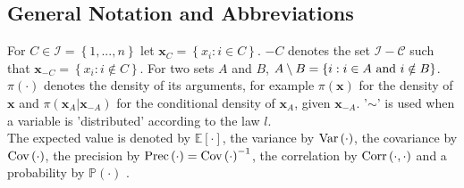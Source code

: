 \subsection{General Notation and Abbreviations}
For $C\in\mathcal{I}=\left\lbrace1,...,n\right\rbrace$ let $\pmb{x}_C=\left\lbrace x_i:i\in C\right\rbrace$. $-C$ denotes the set $\mathcal{I-C}$ such that $\pmb{x}_{-C}=\left\lbrace x_i:i\notin C\right\rbrace$. For two sets $A$ and $B$, $A\setminus B=\left\lbrace i:i\in A \hbox{ and } i \notin B\right\rbrace$. \\
$\pi\left(\cdot\right)$ denotes the density of its arguments, for example $\pi\left(\pmb{x}\right)$ for the density of $\pmb{x}$ and $\pi\left(\pmb{x}_A|\pmb{x}_{-A}\right)$ for the conditional density of $\pmb{x}_A$, given $\pmb{x}_{-A}$. '$\sim$' is used when a variable is 'distributed' according to the law $l$.  \\
The expected value is denoted by $\mathbb{E}\left[\cdot\right]$, the variance by $\hbox{Var}\left(\cdot\right)$, the covariance by $\hbox{Cov}\left(\cdot\right)$, the precision by $\hbox{Prec}\left(\cdot\right)=\hbox{Cov}\left(\cdot\right)^{-1}$, the correlation by $\hbox{Corr}\left(\cdot,\cdot\right)$ and a probability by $\mathbb{P}\left(\cdot\right)$  \autocite[][16]{rue2005gaussian}.
